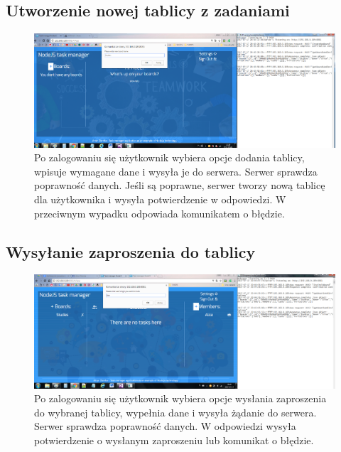 \documentclass[12pt]{report}
\begin{document}
\subsection{Utworzenie nowej tablicy z zadaniami}
\begin{figure}[!hb]
\centering
\includegraphics[width=\textwidth,height=\textheight,keepaspectratio]{72.png}
\captionsetup{labelformat=empty}
\caption[]{Po zalogowaniu się użytkownik wybiera opcje dodania tablicy, wpisuje wymagane dane i wysyła je do serwera. 
Serwer sprawdza poprawność danych. 
Jeśli są poprawne, serwer tworzy nową tablicę dla użytkownika i wysyła potwierdzenie w odpowiedzi.
W przeciwnym wypadku odpowiada komunikatem o błędzie.}
\end{figure}

\subsection{Wysyłanie zaproszenia do tablicy}
\begin{figure}[!hb]
\centering
\includegraphics[width=\textwidth,height=\textheight,keepaspectratio]{02.png}
\captionsetup{labelformat=empty}
\caption[]{Po zalogowaniu się użytkownik wybiera opcje wysłania zaproszenia do wybranej tablicy, wypełnia dane i wysyła żądanie do serwera. Serwer sprawdza poprawność danych. 
W odpowiedzi wysyła potwierdzenie o wysłanym zaproszeniu lub komunikat o błędzie.}
\end{figure}

\newpage 
\end{document}
